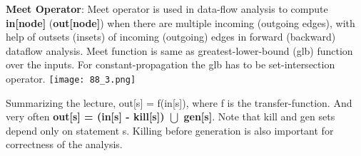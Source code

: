 \textbf{Meet Operator}: Meet operator is used in data-flow analysis to compute \textbf{in[node]} (\textbf{out[node]}) when there are multiple incoming (outgoing edges), with help of outsets (insets) of incoming (outgoing) edges in forward (backward) dataflow analysis.
Meet function is same as greatest-lower-bound (glb) function over the inputs. For constant-propagation the glb has to be set-intersection operator.
\texttt{[image: 88\_3.png]}

Summarizing the lecture, out[s] = f(in[s]), where f is the transfer-function. And very often \textbf{out[s] = (in[s] - kill[s]) $\bigcup$ gen[s]}. Note that kill and gen sets depend only on statement s. Killing before generation is also important for correctness of the analysis.